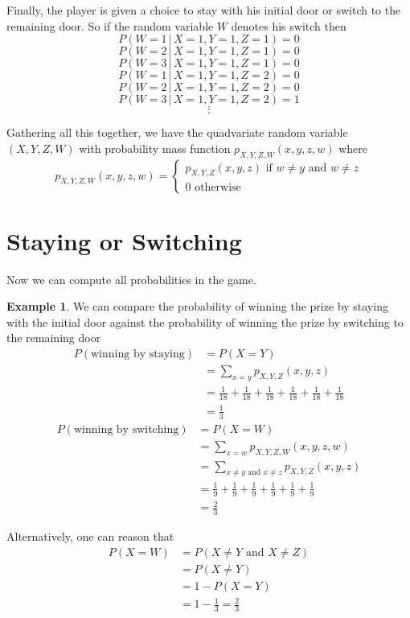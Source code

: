 \documentclass[11pt]{amsart}
\theoremstyle{definition}
\newtheorem{example}[theorem]{Example}
\begin{document}
Finally, the player is given a choice to stay with his initial door or switch to the remaining door. So if the random variable $W$ denotes his switch then
$$P(W = 1 \,|\, X = 1, Y = 1, Z = 1) = 0$$
$$P(W = 2 \,|\, X = 1, Y = 1, Z = 1) = 0$$
$$P(W = 3 \,|\, X = 1, Y = 1, Z = 1) = 0$$
$$P(W = 1 \,|\, X = 1, Y = 1, Z = 2) = 0$$
$$P(W = 2 \,|\, X = 1, Y = 1, Z = 2) = 0$$
$$P(W = 3 \,|\, X = 1, Y = 1, Z = 2) = 1$$
$$\vdots$$

Gathering all this together, we have the quadvariate random variable $(X, Y, Z, W)$ with probability mass function $p_{X, Y, Z, W}(x, y, z, w)$ where
$$p_{X, Y, Z, W}(x, y, z, w) = \begin{cases} p_{X,Y,Z}(x, y, z) \text{ if } w \neq y \text{ and } w \neq z \\ 0 \text{ otherwise}\end{cases}$$

\section{Staying or Switching}
Now we can compute all probabilities in the game.

\begin{example} We can compare the probability of winning the prize by staying with the initial door against the probability of winning the prize by switching to the remaining door
\begin{align*}
P(\text{winning by staying}) & = P(X = Y) \\
 & = \sum\limits_{x = y} p_{X,Y,Z}(x, y, z) \\
 & = \frac{1}{18} + \frac{1}{18} + \frac{1}{18} + \frac{1}{18} + \frac{1}{18} + \frac{1}{18} \\
 & = \frac{1}{3}
\end{align*}
\begin{align*}
P(\text{winning by switching}) & = P(X = W) \\
 & = \sum\limits_{x = w} p_{X, Y, Z, W}(x, y, z, w) \\
 & = \sum\limits_{x \neq y \text{ and } x \neq z} p_{X,Y,Z}(x, y, z) \\
 & = \frac{1}{9} + \frac{1}{9} + \frac{1}{9} + \frac{1}{9} + \frac{1}{9} + \frac{1}{9} \\
 & = \frac{2}{3}
\end{align*}

Alternatively, one can reason that
\begin{align*}
P(X = W) & = P(X \neq Y \text{ and } X \neq Z) \\
 & = P(X \neq Y) \\
 & = 1 - P(X = Y) \\
 & = 1 - \frac{1}{3} = \frac{2}{3}
\end{align*}
\end{example}
\end{document}
